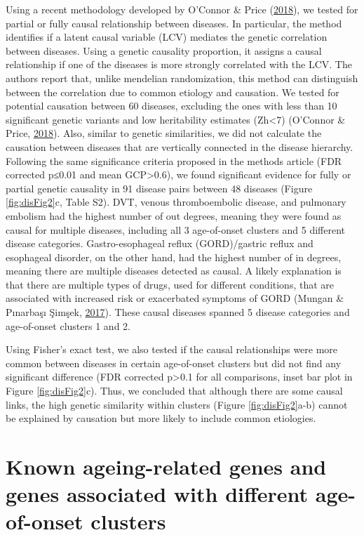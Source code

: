 \documentclass[12pt,twoside]{unicam}
\begin{document}
Using a recent methodology developed by O'Connor \& Price (\protect\hyperlink{ref-OConnor2018}{2018}), we tested for partial or fully causal relationship between diseases. In particular, the method identifies if a latent causal variable (LCV) mediates the genetic correlation between diseases. Using a genetic causality proportion, it assigns a causal relationship if one of the diseases is more strongly correlated with the LCV. The authors report that, unlike mendelian randomization, this method can distinguish between the correlation due to common etiology and causation. We tested for potential causation between 60 diseases, excluding the ones with less than 10 significant genetic variants and low heritability estimates (Zh\textless7) (O'Connor \& Price, \protect\hyperlink{ref-OConnor2018}{2018}). Also, similar to genetic similarities, we did not calculate the causation between diseases that are vertically connected in the disease hierarchy. Following the same significance criteria proposed in the methods article (FDR corrected p≤0.01 and mean GCP\textgreater0.6), we found significant evidence for fully or partial genetic causality in 91 disease pairs between 48 diseases (Figure \ref{fig:disFig2}c, Table S2). DVT, venous thromboembolic disease, and pulmonary embolism had the highest number of out degrees, meaning they were found as causal for multiple diseases, including all 3 age-of-onset clusters and 5 different disease categories. Gastro-esophageal reflux (GORD)/gastric reflux and esophageal disorder, on the other hand, had the highest number of in degrees, meaning there are multiple diseases detected as causal. A likely explanation is that there are multiple types of drugs, used for different conditions, that are associated with increased risk or exacerbated symptoms of GORD (Mungan \& Pınarbaşı Şimşek, \protect\hyperlink{ref-Mungan2017}{2017}). These causal diseases spanned 5 disease categories and age-of-onset clusters 1 and 2.

Using Fisher's exact test, we also tested if the causal relationships were more common between diseases in certain age-of-onset clusters but did not find any significant difference (FDR corrected p\textgreater0.1 for all comparisons, inset bar plot in Figure \ref{fig:disFig2}c). Thus, we concluded that although there are some causal links, the high genetic similarity within clusters (Figure \ref{fig:disFig2}a-b) cannot be explained by causation but more likely to include common etiologies.

\hypertarget{known-ageing-related-genes-and-genes-associated-with-different-age-of-onset-clusters}{%
\section{Known ageing-related genes and genes associated with different age-of-onset clusters}\label{known-ageing-related-genes-and-genes-associated-with-different-age-of-onset-clusters}}
\end{document}
